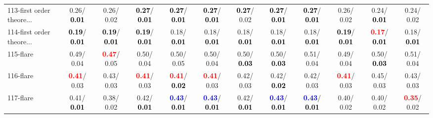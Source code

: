 \begin{table}[h]
\begin{center}
{\begin{tabular}{lc|c|c|c|c|c|c|c|c|c|c}
113-first order theore... &   0.26/\textcolor{black}{\textbf{  0.01}} &   0.26/  0.02 & \textcolor{black}{\textbf{  0.27}}/\textcolor{black}{\textbf{  0.01}} & \textcolor{black}{\textbf{  0.27}}/\textcolor{black}{\textbf{  0.01}} & \textcolor{black}{\textbf{  0.27}}/\textcolor{black}{\textbf{  0.01}} & \textcolor{black}{\textbf{  0.27}}/  0.02 & \textcolor{black}{\textbf{  0.27}}/\textcolor{black}{\textbf{  0.01}} & \textcolor{black}{\textbf{  0.27}}/\textcolor{black}{\textbf{  0.01}} &   0.26/  0.02 &   0.24/\textcolor{black}{\textbf{  0.01}} &   0.24/  0.02 \\
114-first order theore... & \textcolor{black}{\textbf{  0.19}}/\textcolor{black}{\textbf{  0.01}} & \textcolor{black}{\textbf{  0.19}}/\textcolor{black}{\textbf{  0.01}} & \textcolor{black}{\textbf{  0.19}}/\textcolor{black}{\textbf{  0.01}} &   0.18/\textcolor{black}{\textbf{  0.01}} &   0.18/\textcolor{black}{\textbf{  0.01}} &   0.18/\textcolor{black}{\textbf{  0.01}} &   0.18/\textcolor{black}{\textbf{  0.01}} &   0.18/\textcolor{black}{\textbf{  0.01}} & \textcolor{black}{\textbf{  0.19}}/\textcolor{black}{\textbf{  0.01}} & \textcolor{red}{\textbf{  0.17}}/\textcolor{black}{\textbf{  0.01}} &   0.18/\textcolor{black}{\textbf{  0.01}} \\
115-flare &   0.49/  0.04 & \textcolor{red}{\textbf{  0.47}}/  0.05 &   0.50/  0.04 &   0.50/  0.05 &   0.50/  0.04 &   0.50/\textcolor{black}{\textbf{  0.03}} &   0.50/\textcolor{black}{\textbf{  0.03}} &   0.51/  0.04 &   0.49/  0.04 &   0.50/\textcolor{black}{\textbf{  0.03}} &   0.51/  0.04 \\
116-flare & \textcolor{red}{\textbf{  0.41}}/  0.03 &   0.43/  0.03 & \textcolor{red}{\textbf{  0.41}}/  0.03 & \textcolor{red}{\textbf{  0.41}}/\textcolor{black}{\textbf{  0.02}} & \textcolor{red}{\textbf{  0.41}}/  0.03 &   0.42/  0.03 &   0.42/\textcolor{black}{\textbf{  0.02}} &   0.42/  0.03 & \textcolor{red}{\textbf{  0.41}}/  0.03 &   0.45/  0.03 &   0.43/  0.03 \\
117-flare &   0.41/\textcolor{black}{\textbf{  0.01}} &   0.38/  0.02 &   0.42/\textcolor{black}{\textbf{  0.01}} & \textcolor{blue}{\textbf{  0.43}}/\textcolor{black}{\textbf{  0.01}} & \textcolor{blue}{\textbf{  0.43}}/\textcolor{black}{\textbf{  0.01}} &   0.42/\textcolor{black}{\textbf{  0.01}} & \textcolor{blue}{\textbf{  0.43}}/\textcolor{black}{\textbf{  0.01}} & \textcolor{blue}{\textbf{  0.43}}/\textcolor{black}{\textbf{  0.01}} &   0.40/  0.02 &   0.40/  0.02 & \textcolor{red}{\textbf{  0.35}}/  0.02 \\ \hline

\end{tabular}}
\end{center}
\end{table}
